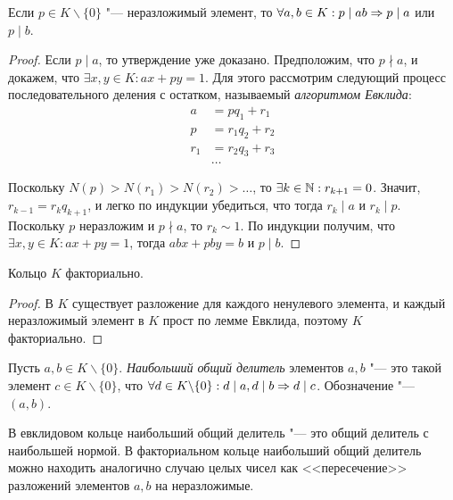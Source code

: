 \begin{proposition}
	Если $p \in K \backslash \{0\}$ "--- неразложимый элемент, то $\forall a, b \in K: p \mid ab \Rightarrow p \mid a$ или $p \mid b$.
\end{proposition}

\begin{proof}
	Если $p \mid a$, то утверждение уже доказано. Предположим, что $p \nmid a$, и докажем, что $\exists x, y \in K: ax + py = 1$. Для этого рассмотрим следующий процесс последовательного деления с остатком, называемый \textit{алгоритмом Евклида}:
	\begin{align*}
		a &= pq_1 + r_1\\
		p &= r_1q_2 + r_2\\
		r_1 &= r_2q_3 + r_3\\
		&\dots
	\end{align*}

	Поскольку $N(p) > N(r_1) > N(r_2) > \dotsc$, то $\exists k \in \mathbb{N}: r_{k + 1} = 0$. Значит, $r_{k - 1} = r_kq_{k+1}$, и легко по индукции убедиться, что тогда $r_k \mid a$ и $r_k \mid p$. Поскольку $p$ неразложим и $p \nmid a$, то $r_k \sim 1$. По индукции получим, что $\exists x, y \in K: ax + py = 1$, тогда $abx + pby = b$ и $p \mid b$.
\end{proof}

\begin{theorem}
	Кольцо $K$ факториально.
\end{theorem}

\begin{proof}
	В $K$ существует разложение для каждого ненулевого элемента, и каждый неразложимый элемент в $K$ прост по лемме Евклида, поэтому $K$ факториально.
\end{proof}

\begin{definition}
	Пусть $a, b \in K \backslash \{0\}$. \textit{Наибольший общий делитель} элементов $a, b$ "--- это такой элемент $c \in K \backslash \{0\}$, что $\forall d \in K \backslash \{0\}: d \mid a, d \mid b \Rightarrow d \mid c$. Обозначение "--- $(a, b)$.
\end{definition}

\begin{note}
	В евклидовом кольце наибольший общий делитель "--- это общий делитель с наибольшей нормой. В факториальном кольце наибольший общий делитель можно находить аналогично случаю целых чисел как <<пересечение>> разложений элементов $a, b$ на неразложимые.
\end{note}